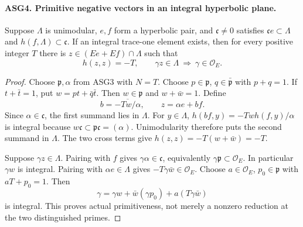 \paragraph{ASG4. Primitive negative vectors in an integral hyperbolic plane.}
\label{claim:ASG4}
Suppose \(\Lambda\) is unimodular, \(e,f\) form a hyperbolic
pair, and \(\mathfrak c\ne0\) satisfies
\(\mathfrak c e\subset\Lambda\) and
\(h(f,\Lambda)\subset\mathfrak c\).  If an integral trace-one
element exists, then for every positive integer \(T\) there is
\(z\in(Ee+Ef)\cap\Lambda\) such that
\[
 h(z,z)=-T,\qquad
       \gamma z\in\Lambda\ \Longrightarrow\ \gamma\in\mathcal O_E.
\tag{ASG.4}
\]
\begin{proof}
Choose \(\mathfrak p,\alpha\) from ASG3 with \(N=T\).
Choose \(p\in\mathfrak p\), \(q\in\bar{\mathfrak p}\)
with \(p+q=1\).  If \(t+\bar t=1\), put
\(w=pt+\bar q\bar t\).  Then \(w\in\mathfrak p\)
and \(w+\bar w=1\).  Define
\[
             b=\overline{-Tw/\alpha},\qquad z=\alpha e+bf.
\tag{ASG.5}
\]
Since \(\alpha\in\mathfrak c\), the first summand lies in
\(\Lambda\).  For \(y\in\Lambda\),
\(h(bf,y)=-Tw h(f,y)/\alpha\) is integral because
\(w\mathfrak c\subset\mathfrak p\mathfrak c=(\alpha)\).
Unimodularity therefore puts the second summand in \(\Lambda\).
The two cross terms give \(h(z,z)=-T(w+\bar w)=-T\).

Suppose \(\gamma z\in\Lambda\).  Pairing with \(f\)
gives \(\gamma\alpha\in\mathfrak c\), equivalently
\(\gamma\mathfrak p\subset\mathcal O_E\).  In particular
\(\gamma w\) is integral.  Pairing with \(\alpha e\in\Lambda\)
gives \(-T\gamma\bar w\in\mathcal O_E\).
Choose \(a\in\mathcal O_E\), \(p_0\in\mathfrak p\)
with \(aT+p_0=1\).  Then
\[
        \gamma=\gamma w+\bar w(\gamma p_0)
                              +a(T\gamma\bar w)
\]
is integral.  This proves actual primitiveness, not merely a nonzero
reduction at the two distinguished primes.
\end{proof}

